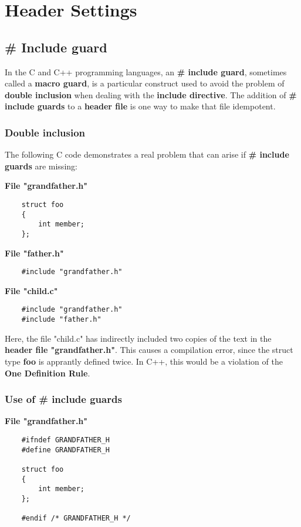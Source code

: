 	\chapter{Header Settings}	
	\section{\# Include guard}
	In the C and C++ programming languages, an \textbf{\# include guard}, sometimes called a \textbf{macro guard}, is a particular construct used to avoid the problem of \textbf{double inclusion} when dealing with the \textbf{include directive}. The addition of \textbf{\# include guards} to a \textbf{header file} is one way to make that file idempotent.
	
	\subsection{Double inclusion}
	The following C code demonstrates a real problem that can arise if \textbf{\# include guards} are missing:
	
	\textbf{File "grandfather.h"}
	
	\begin{verbatim}
	struct foo
	{
		int member;
	};
	\end{verbatim}
	
	\textbf{File "father.h"}
	\begin{verbatim}
	#include "grandfather.h"
	\end{verbatim}
	
	\textbf{File "child.c"}
	\begin{verbatim}
	#include "grandfather.h"
	#include "father.h"
	\end{verbatim}
	
	Here, the file "child.c" has indirectly included two copies of the text in the \textbf{header file "grandfather.h"}. This causes a compilation error, since the struct type \textbf{foo} is apprantly defined twice. In C++, this would be a violation of the \textbf{One Definition Rule}.
	
	\subsection{Use of \# include guards}
	\textbf{File "grandfather.h"}
	
	\begin{verbatim}
	#ifndef GRANDFATHER_H
	#define GRANDFATHER_H
	
	struct foo
	{
		int member;
	};
	
	#endif /* GRANDFATHER_H */
	\end{verbatim}
	
